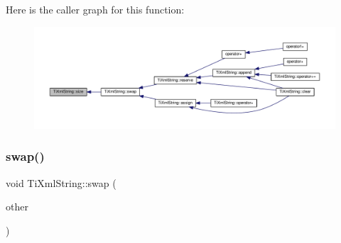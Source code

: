 Here is the caller graph for this function\+:
\nopagebreak
\begin{figure}[H]
\begin{center}
\leavevmode
\includegraphics[width=350pt]{class_ti_xml_string_a483d85103d2a3ba8c0831e205c832f33_icgraph}
\end{center}
\end{figure}
\mbox{\label{class_ti_xml_string_aa392cbc180752a79f007f4f9280c7762}} 
\subsubsection{\texorpdfstring{swap()}{swap()}}
{\footnotesize\ttfamily void Ti\+Xml\+String\+::swap (\begin{DoxyParamCaption}\item[{\hyperlink{class_ti_xml_string}{Ti\+Xml\+String} \&}]{other }\end{DoxyParamCaption})\hspace{0.3cm}{\ttfamily [inline]}}

